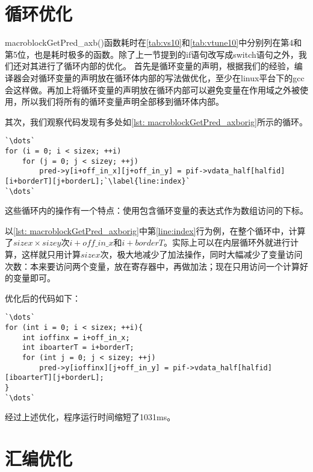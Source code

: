 \section{循环优化}
\label{sec:singlecoreloopopt}

macroblockGetPred\_axb()函数耗时在\autoref{tab:vs10}和\autoref{tab:vtune10}中分别列在第4和第5位，也是耗时极多的函数。除了上一节提到的if语句改写成switch语句之外，我们还对其进行了循环内部的优化。
首先是循环变量的声明，根据我们的经验，编译器会对循环变量的声明放在循环体内部的写法做优化，至少在linux平台下的gcc会这样做。再加上将循环变量的声明放在循环内部可以避免变量在作用域之外被使用，所以我们将所有的循环变量声明全部移到循环体内部。

其次，我们观察代码发现有多处如\autoref{lst: macroblockGetPred_axborig}所示的循环。

\begin{lstlisting}[caption = {macroblockGetPred\_axb()函数片段（优化前）}, label = lst: macroblockGetPred_axborig]
`\dots`
for (i = 0; i < sizex; ++i)
	for (j = 0; j < sizey; ++j)
		pred->y[i+off_in_x][j+off_in_y] = pif->vdata_half[halfid][i+borderT][j+borderL];`\label{line:index}`
`\dots`
\end{lstlisting}

这些循环内的操作有一个特点：使用包含循环变量的表达式作为数组访问的下标。

以\autoref{lst: macroblockGetPred_axborig}中第\ref{line:index}行为例，在整个循环中，计算了$sizex\times sizey$次$i+off\_in\_x$和$i+borderT$。实际上可以在内层循环外就进行计算，这样就只用计算$sizex$次，极大地减少了加法操作，同时大幅减少了变量访问次数：本来要访问两个变量，放在寄存器中，再做加法；现在只用访问一个计算好的变量即可。

优化后的代码如下：
\begin{lstlisting}[caption = {macroblockGetPred\_axb()函数片段（优化后）}, label = lst: macroblockGetPred_axbopt]
`\dots`
for (int i = 0; i < sizex; ++i){
	int ioffinx = i+off_in_x;
	int iboarterT = i+borderT;
	for (int j = 0; j < sizey; ++j)
		pred->y[ioffinx][j+off_in_y] = pif->vdata_half[halfid][iboarterT][j+borderL];
}
`\dots`
\end{lstlisting}

经过上述优化，程序运行时间缩短了1031ms。


\section{汇编优化}
\label{sec:singlecoreasmopt}

